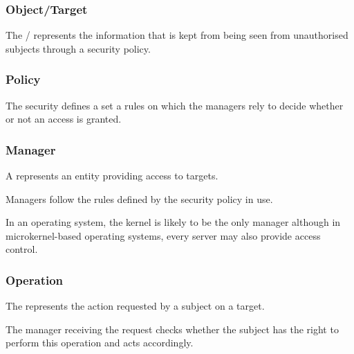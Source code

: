 
\begin{frame}
  \frametitle{Object/Target}

  The / represents the information that is kept
  from being seen from unauthorised subjects through a security policy.
\end{frame}


\begin{frame}
  \frametitle{Policy}

  The security  defines a set a rules on which the
  managers rely to decide whether or not an access is granted.
\end{frame}


\begin{frame}
  \frametitle{Manager}

  A  represents an entity providing access to targets.

  \-

  Managers follow the rules defined by the security policy in use.

  \-

  In an operating system, the kernel is likely to be the only manager although
  in microkernel-based operating systems, every server may also provide access
  control.
\end{frame}


\begin{frame}
  \frametitle{Operation}

  The  represents the action requested by a subject on
  a target.

  \-

  The manager receiving the request checks whether the subject has the right
  to perform this operation and acts accordingly.
\end{frame}



